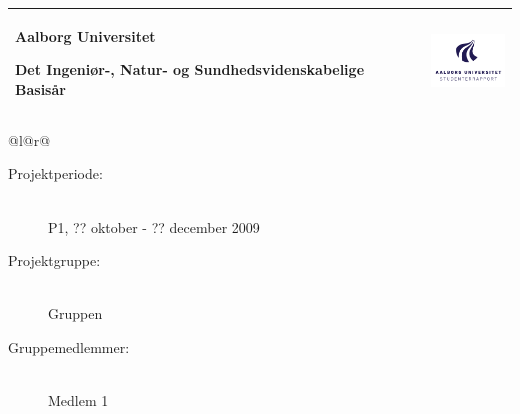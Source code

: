 \newlength{\realparindent}
\newlength{\realparskip}
\setlength{\realparindent}{\parindent}
\setlength{\realparskip}{\parskip}

\begin{nopagebreak}
{
\begin{center}
    \samepage
    \begin{tabular*}{\textwidth}{@{} l @{\extracolsep{\fill}}r@{}}
        \parbox[b]{11cm}{
            {\LARGE Aalborg Universitet}
            
            {\large Det Ingeniør-, Natur- og Sundhedsvidenskabelige Basisår}
        }
        & \includegraphics[width=2cm]{Billeder/AAU-logo-stud-DK-RGB} \\
        \hline
    \end{tabular*}
    \vspace{0.4cm}

    \begin{tabular*}{\textwidth}{@{}l@{\extracolsep{\fill}}r@{}}
        \\
        \begin{minipage}[t]{0.49\textwidth}
            \begin{description}
                \item[Projektperiode:]~\\
                P1, ?? oktober - ?? december 2009
                \vspace{0.2cm}

                \item[Projektgruppe:]~\\
                Gruppen
                  
                \item[Gruppemedlemmer:]~\\
                Medlem 1 


\end{description}
\end{minipage}
\end{tabular*}
\end{center}}
\end{nopagebreak}
